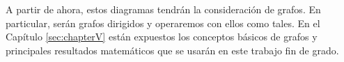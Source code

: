 A partir de ahora, estos diagramas tendrán la consideración de grafos. En particular, serán grafos dirigidos y operaremos con ellos como tales. En el Capítulo \ref{sec:chapterV} están expuestos los conceptos básicos de grafos y principales resultados matemáticos que se usarán en este trabajo fin de grado.
